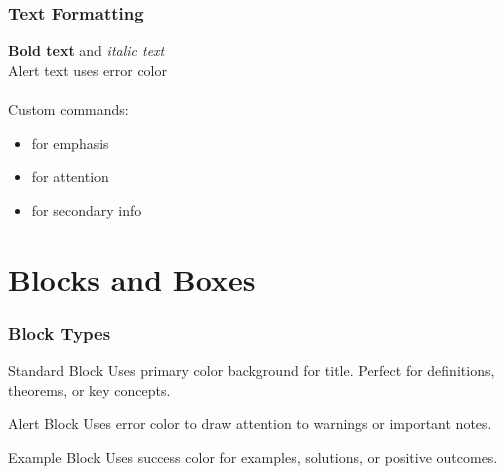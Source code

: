 \documentclass{beamer}
\begin{document}
\begin{frame}
\frametitle{Text Formatting}

\textbf{Bold text} and \textit{italic text} \\
\alert{Alert text uses error color} \\
 \\

\vspace{1em}
Custom commands:
\begin{itemize}
    \item {} for emphasis
    \item {} for attention
    \item {} for secondary info
\end{itemize}
\end{frame}

\section{Blocks and Boxes}

\begin{frame}
\frametitle{Block Types}

\begin{block}{Standard Block}
Uses primary color background for title. Perfect for definitions, theorems, or key concepts.
\end{block}

\begin{alertblock}{Alert Block}
Uses error color to draw attention to warnings or important notes.
\end{alertblock}

\begin{exampleblock}{Example Block}
Uses success color for examples, solutions, or positive outcomes.
\end{exampleblock}

\end{frame}
\end{document}

